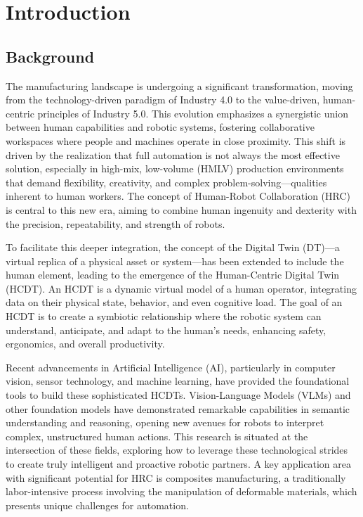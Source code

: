 \chapter{Introduction}
\label{chap:introduction}

\section{Background}
\label{sec:background}

The manufacturing landscape is undergoing a significant transformation, moving from the technology-driven paradigm of Industry 4.0 to the value-driven, human-centric principles of Industry 5.0. This evolution emphasizes a synergistic union between human capabilities and robotic systems, fostering collaborative workspaces where people and machines operate in close proximity. This shift is driven by the realization that full automation is not always the most effective solution, especially in high-mix, low-volume (HMLV) production environments that demand flexibility, creativity, and complex problem-solving—qualities inherent to human workers. The concept of Human-Robot Collaboration (HRC) is central to this new era, aiming to combine human ingenuity and dexterity with the precision, repeatability, and strength of robots.

To facilitate this deeper integration, the concept of the Digital Twin (DT)—a virtual replica of a physical asset or system—has been extended to include the human element, leading to the emergence of the Human-Centric Digital Twin (HCDT). An HCDT is a dynamic virtual model of a human operator, integrating data on their physical state, behavior, and even cognitive load. The goal of an HCDT is to create a symbiotic relationship where the robotic system can understand, anticipate, and adapt to the human's needs, enhancing safety, ergonomics, and overall productivity.

Recent advancements in Artificial Intelligence (AI), particularly in computer vision, sensor technology, and machine learning, have provided the foundational tools to build these sophisticated HCDTs. Vision-Language Models (VLMs) and other foundation models have demonstrated remarkable capabilities in semantic understanding and reasoning, opening new avenues for robots to interpret complex, unstructured human actions. This research is situated at the intersection of these fields, exploring how to leverage these technological strides to create truly intelligent and proactive robotic partners. A key application area with significant potential for HRC is composites manufacturing, a traditionally labor-intensive process involving the manipulation of deformable materials, which presents unique challenges for automation.

